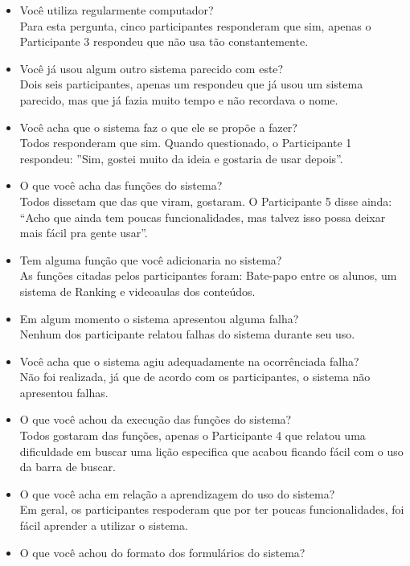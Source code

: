 \begin{itemize}
	\item Você utiliza regularmente computador? \\
	Para esta pergunta, cinco participantes responderam que sim, apenas o Participante 3 respondeu que não usa tão constantemente.
	\item Você já usou algum outro sistema parecido com este? \\	
	Dois seis participantes, apenas um respondeu que já usou um sistema parecido, mas que já fazia muito tempo e não recordava o nome.
	\item Você acha que o sistema faz o que ele se propõe a fazer? \\
	Todos responderam que sim. Quando questionado, o Participante 1 respondeu: ''Sim, gostei muito da ideia e gostaria de usar depois''.
	\item O que você acha das funções do sistema? \\
	Todos dissetam que das que viram, gostaram. O Participante 5 disse ainda: ``Acho que ainda tem poucas funcionalidades, mas talvez isso possa deixar mais fácil pra gente usar''.
	\item Tem alguma função que você adicionaria no sistema? \\
	As funções citadas pelos participantes foram: Bate-papo entre os alunos, um sistema de Ranking e videoaulas dos conteúdos. 
	\item Em algum momento o sistema apresentou alguma falha? \\
	Nenhum dos participante relatou falhas do sistema durante seu uso.
	\item Você acha que o sistema agiu adequadamente na ocorrênciada falha? \\
	Não foi realizada, já que de acordo com os participantes, o sistema não apresentou falhas.
	\item O que você achou da execução das funções do sistema? \\
	Todos gostaram das funções, apenas o Participante 4 que relatou uma dificuldade em buscar uma lição especifica que acabou ficando fácil com o uso da barra de buscar.
	\item O que você acha em relação a aprendizagem do uso do sistema? \\
	Em geral, os participantes respoderam que por ter poucas funcionalidades, foi fácil aprender a utilizar o sistema. 
	\item O que você achou do formato dos formulários do sistema? \\

\end{itemize}
